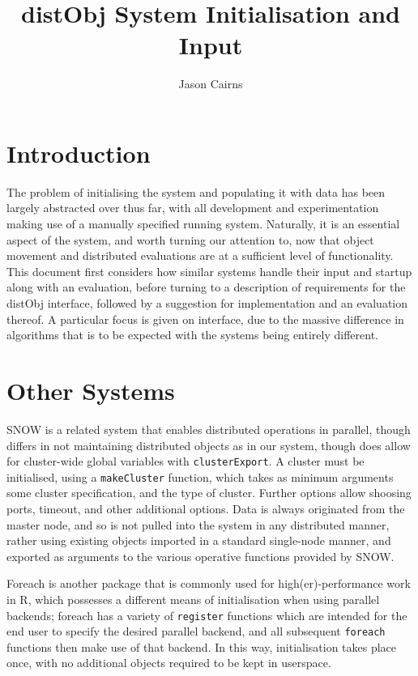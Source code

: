 \documentclass[a4paper,10pt]{article}
\begin{document}
\title{distObj System Initialisation and Input}
\author{Jason Cairns}
  
\maketitle{}

\section{Introduction}

The problem of initialising the system and populating it with data has been
largely abstracted over thus far, with all development and experimentation
making use of a manually specified running system.
Naturally, it is an essential aspect of the system, and worth turning our
attention to, now that object movement and distributed evaluations are at a
sufficient level of functionality.
This document first considers how similar systems handle their input and
startup along with an evaluation, before turning to a description of
requirements for the distObj interface, followed by a suggestion for
implementation and an evaluation thereof.
A particular focus is given on interface, due to the massive difference in
algorithms that is to be expected with the systems being entirely different.

\section{Other Systems}

SNOW is a related system that enables distributed operations in parallel,
though differs in not maintaining distributed objects as in our system, though
does allow for cluster-wide global variables with
\texttt{clusterExport}\cite{tierney18}.
A cluster must be initialised, using a \texttt{makeCluster} function,
which takes as minimum arguments some cluster specification, and the type of
cluster.
Further options allow shoosing ports, timeout, and other additional options.
Data is always originated from the master node, and so is not pulled into the
system in any distributed manner, rather using existing objects imported in a
standard single-node manner, and exported as arguments to the various operative
functions provided by SNOW.

Foreach is another package that is commonly used for high(er)-performance work
in R, which possesses a different means of initialisation when using parallel
backends; foreach has a variety of \texttt{register} functions which are
intended for the end user to specify the desired parallel backend, and all
subsequent \texttt{foreach} functions then make use of that
backend\cite{microsoft20}\cite{corporation19}.
In this way, initialisation takes place once, with no additional objects
required to be kept in userspace.
\end{document}

